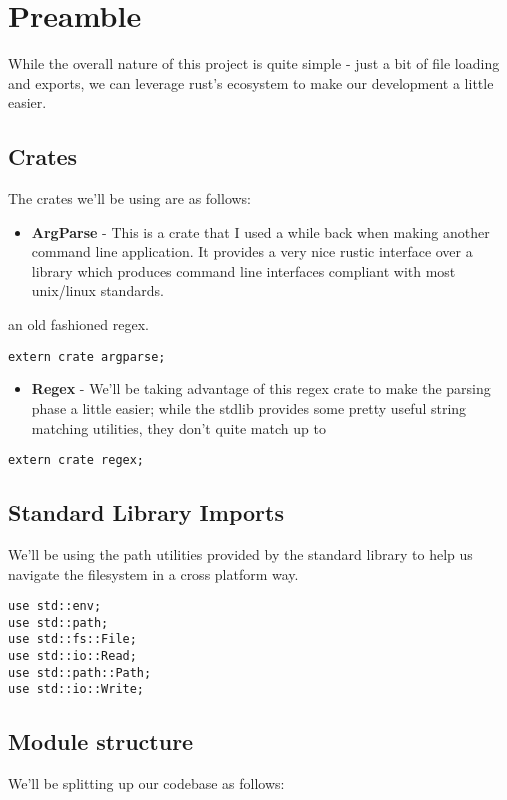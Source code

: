 \documentclass[11pt]{article}
\begin{document}
\section{Preamble}
\label{sec:orge9ec8dc}
While the overall nature of this project is quite simple - just a bit of file loading and exports, we can leverage rust's ecosystem to make our development a little easier.

\subsection{Crates}
\label{sec:org66f8864}
The crates we'll be using are as follows:
\begin{itemize}
\item \textbf{ArgParse} - This is a crate that I used a while back when making another command line application. It provides a very nice rustic interface over a library which produces command line interfaces compliant with most unix/linux standards.
\end{itemize}
an old fashioned regex.
\begin{verbatim}
extern crate argparse;
\end{verbatim}

\begin{itemize}
\item \textbf{Regex} - We'll be taking advantage of this regex crate to make the parsing phase a little easier; while the stdlib provides some pretty useful string matching utilities, they don't quite match up to
\end{itemize}
\begin{verbatim}
extern crate regex;
\end{verbatim}

\subsection{Standard Library Imports}
\label{sec:orgcdab800}
We'll be using the path utilities provided by the standard library to help us navigate the filesystem in a cross platform way.
\begin{verbatim}
use std::env;
use std::path;
use std::fs::File;
use std::io::Read;
use std::path::Path;
use std::io::Write;
\end{verbatim}
\subsection{Module structure}
\label{sec:org954d78c}
We'll be splitting up our codebase as follows:
\end{document}
